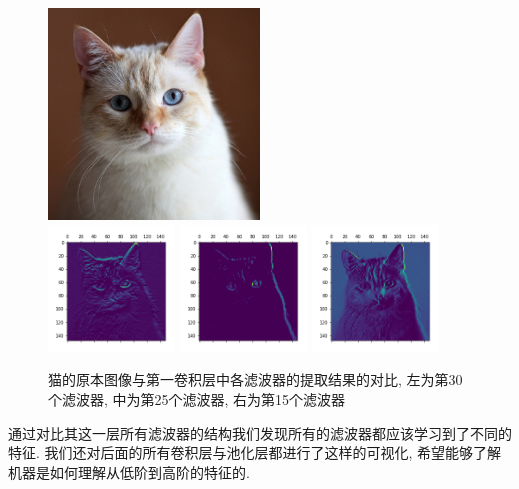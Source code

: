 \documentclass[lang=cn,11pt]{elegantpaper}
\begin{document}
\begin{figure}[hbtp]
\centering
  \includegraphics[width=0.5\textwidth]{a.jpg} \\
  \includegraphics[width=0.30\textwidth]{30.png}
  \includegraphics[width=0.30\textwidth]{25}
  \includegraphics[width=0.30\textwidth]{15}
  \caption{猫的原本图像与第一卷积层中各滤波器的提取结果的对比, 左为第30个滤波器, 中为第25个滤波器, 右为第15个滤波器}
\end{figure}

通过对比其这一层所有滤波器的结构我们发现所有的滤波器都应该学习到了不同的特征. 我们还对后面的所有卷积层与池化层都进行了这样的可视化, 希望能够了解机器是如何理解从低阶到高阶的特征的.
\end{document}

